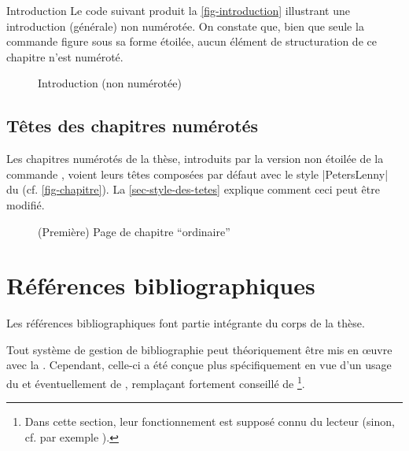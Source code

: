 \begin{dbexample}{Introduction}{}
  Le code suivant produit la \vref{fig-introduction} illustrant une
  introduction (générale) non numérotée. On constate que, bien que seule la
  commande  figure sous sa forme étoilée, aucun élément
  de structuration de ce chapitre n'est numéroté.
\end{dbexample}

\begin{figure}[p]
  \centering
  \caption{Introduction (non numérotée)}
  \label{fig-introduction}
\end{figure}

\subsection{Têtes des chapitres numérotés}
\label{sec-chapitres-numerotes}%
%

Les chapitres numérotés de la thèse, introduits par la version non étoilée de la
commande , voient leurs têtes composées par défaut avec
le style |PetersLenny| du  (cf. \vref{fig-chapitre}). La
\vref{sec-style-des-tetes} explique comment ceci peut être modifié.

\begin{figure}[ht]
  \centering
  \caption[Chapitre \enquote{ordinaire}]{(Première) Page de chapitre
    \enquote{ordinaire}}
  \label{fig-chapitre}
\end{figure}

\section{Références bibliographiques}\label{sec-refer-bibl}
%

Les références bibliographiques font partie intégrante du corps de la thèse.

Tout système de gestion de bibliographie peut théoriquement être mis en œuvre
avec la \yatCl. Cependant, celle-ci a été conçue plus spécifiquement en vue
d'un usage du  et éventuellement de ,
remplaçant fortement conseillé de \footnote{Dans cette section,
  leur fonctionnement est supposé connu du lecteur (sinon, cf. par exemple
  \cite{en-ligne6}).}.

